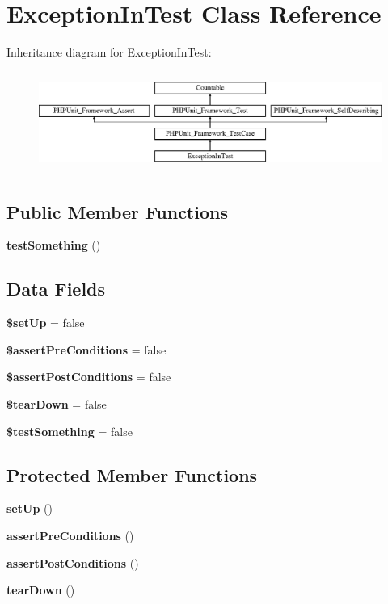 \section{Exception\+In\+Test Class Reference}
\label{class_exception_in_test}
Inheritance diagram for Exception\+In\+Test\+:\begin{figure}[H]
\begin{center}
\leavevmode
\includegraphics[height=3.303835cm]{class_exception_in_test}
\end{center}
\end{figure}
\subsection*{Public Member Functions}
\begin{DoxyCompactItemize}
\item 
{\bf test\+Something} ()
\end{DoxyCompactItemize}
\subsection*{Data Fields}
\begin{DoxyCompactItemize}
\item 
{\bf \$set\+Up} = false
\item 
{\bf \$assert\+Pre\+Conditions} = false
\item 
{\bf \$assert\+Post\+Conditions} = false
\item 
{\bf \$tear\+Down} = false
\item 
{\bf \$test\+Something} = false
\end{DoxyCompactItemize}
\subsection*{Protected Member Functions}
\begin{DoxyCompactItemize}
\item 
{\bf set\+Up} ()
\item 
{\bf assert\+Pre\+Conditions} ()
\item 
{\bf assert\+Post\+Conditions} ()
\item 
{\bf tear\+Down} ()
\end{DoxyCompactItemize}
